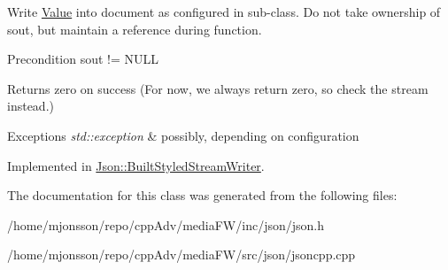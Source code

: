 Write \hyperlink{classJson_1_1Value}{Value} into document as configured in sub-\/class. Do not take ownership of sout, but maintain a reference during function. \begin{DoxyPrecond}{Precondition}
sout != N\+U\+LL 
\end{DoxyPrecond}
\begin{DoxyReturn}{Returns}
zero on success (For now, we always return zero, so check the stream instead.) 
\end{DoxyReturn}

\begin{DoxyExceptions}{Exceptions}
{\em std\+::exception} & possibly, depending on configuration \\
\hline
\end{DoxyExceptions}


Implemented in \hyperlink{structJson_1_1BuiltStyledStreamWriter_a823cdb1afabb6b0d5f39bcd5a6a6f747}{Json\+::\+Built\+Styled\+Stream\+Writer}.



The documentation for this class was generated from the following files\+:\begin{DoxyCompactItemize}
\item 
/home/mjonsson/repo/cpp\+Adv/media\+F\+W/inc/json/json.\+h\item 
/home/mjonsson/repo/cpp\+Adv/media\+F\+W/src/json/jsoncpp.\+cpp\end{DoxyCompactItemize}
